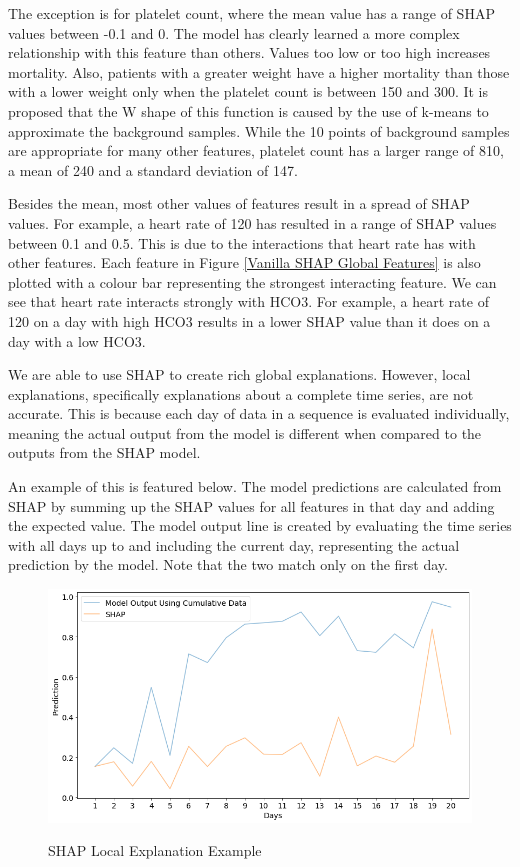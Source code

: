 \documentclass[12pt]{article}
\begin{document}
The exception is for platelet count, where the mean value has a range of SHAP values between -0.1 and 0. The model has clearly learned a more complex relationship with this feature than others. Values too low or too high increases mortality. Also, patients with a greater weight have a higher mortality than those with a lower weight only when the platelet count is between 150 and 300. It is proposed that the W shape of this function is caused by the use of k-means to approximate the background samples. While the 10 points of background samples are appropriate for many other features, platelet count has a larger range of 810, a mean of 240 and a standard deviation of 147.

Besides the mean, most other values of features result in a spread of SHAP values. For example, a heart rate of 120 has resulted in a range of SHAP values between 0.1 and 0.5. This is due to the interactions that heart rate has with other features. Each feature in Figure \ref{Vanilla SHAP Global Features} is also plotted with a colour bar representing the strongest interacting feature. We can see that heart rate interacts strongly with HCO3. For example, a heart rate of 120 on a day with high HCO3 results in a lower SHAP value than it does on a day with a low HCO3.

We are able to use SHAP to create rich global explanations. However, local explanations, specifically explanations about a complete time series, are not accurate. This is because each day of data in a sequence is evaluated individually, meaning the actual output from the model is different when compared to the outputs from the SHAP model.

An example of this is featured below. The model predictions are calculated from SHAP by summing up the SHAP values for all features in that day and adding the expected value. The model output line is created by evaluating the time series with all days up to and including the current day, representing the actual prediction by the model. Note that the two match only on the first day.

\begin{figure}[H]
\centering\caption{SHAP Local Explanation Example}
\includegraphics[scale=0.4]{Vanilla SHAP local1.png}
\label{SHAP Local Explanation Example}
\end{figure}
\end{document}
